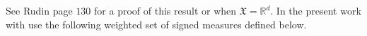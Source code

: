 \documentclass[11pt,a4paper]{article}
\newcommand{\RR}{\mathbb{R}}
\newcommand{\NN}{\mathbb{N}}
\newcommand{\MC}{\mathcal{M}}
\newcommand{\XF}{\mathfrak{X}}
\newcommand{\Seq}[1]{\left(#1\right)_{n\in \mathbb{N}}}
\newcommand{\brac}[1]{\left\langle#1\right\rangle}
\newcommand{\dd}{\mathop{}\!\mathrm{d}}
\newtheorem{proposition}[theorem]{Proposition}
\begin{document}
See Rudin \cite{rudin1987real} page $130$ for a proof of this result or \cite{evans2018measure} when $\XF = \RR^d$. In the present work with use the following weighted set of signed measures defined below.
\end{document}
